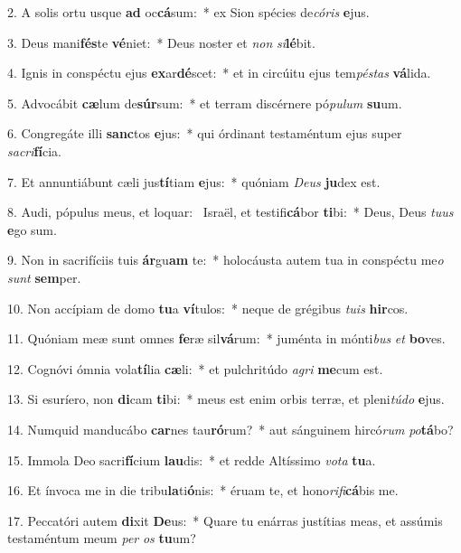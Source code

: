 2. A solis ortu usque \textbf{ad} oc\textbf{cá}sum:~*  ex Sion spécies de\textit{có}\textit{ris} \textbf{e}jus.\

3. Deus mani\textbf{fés}te \textbf{vé}niet:~*  Deus noster et \textit{non} \textit{si}\textbf{lé}bit.\

4. Ignis in conspéctu ejus \textbf{ex}ar\textbf{dé}scet:~*  et in circúitu ejus tem\textit{pés}\textit{tas} \textbf{vá}lida.\

5. Advocábit \textbf{cæ}lum de\textbf{súr}sum:~*  et terram discérnere pó\textit{pu}\textit{lum} \textbf{su}um.\

6. Congregáte illi \textbf{sanc}tos \textbf{e}jus:~*  qui órdinant testaméntum ejus super \textit{sa}\textit{cri}\textbf{fí}cia.\

7. Et annuntiábunt cæli jus\textbf{tí}tiam \textbf{e}jus:~*  quóniam \textit{De}\textit{us} \textbf{ju}dex est.\

8. Audi, pópulus meus, et loquar: \dag\  Israël, et testifi\textbf{cá}bor \textbf{ti}bi:~*  Deus, Deus \textit{tu}\textit{us} \textbf{e}go sum.\

9. Non in sacrifíciis tuis \textbf{ár}gu\textbf{am} te:~*  holocáusta autem tua in conspéctu me\textit{o} \textit{sunt} \textbf{sem}per.\

10. Non accípiam de domo \textbf{tu}a \textbf{ví}tulos:~*  neque de grégibus \textit{tu}\textit{is} \textbf{hir}cos.\

11. Quóniam meæ sunt omnes \textbf{fe}ræ sil\textbf{vá}rum:~*  juménta in mónti\textit{bus} \textit{et} \textbf{bo}ves.\

12. Cognóvi ómnia vola\textbf{tí}lia \textbf{cæ}li:~*  et pulchritúdo \textit{a}\textit{gri} \textbf{me}cum est.\

13. Si esuríero, non \textbf{di}cam \textbf{ti}bi:~*  meus est enim orbis terræ, et pleni\textit{tú}\textit{do} \textbf{e}jus.\

14. Numquid manducábo \textbf{car}nes tau\textbf{ró}rum?~*  aut sánguinem hircó\textit{rum} \textit{po}\textbf{tá}bo?\

15. Immola Deo sacri\textbf{fí}cium \textbf{lau}dis:~*  et redde Altíssimo \textit{vo}\textit{ta} \textbf{tu}a.\

16. Et ínvoca me in die tribu\textbf{la}ti\textbf{ó}nis:~*  éruam te, et hono\textit{ri}\textit{fi}\textbf{cá}bis me.\

17. Peccatóri autem \textbf{di}xit \textbf{De}us:~*  Quare tu enárras justítias meas, et assúmis testaméntum meum \textit{per} \textit{os} \textbf{tu}um?\

